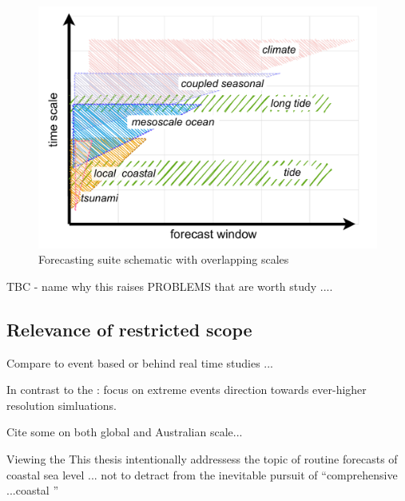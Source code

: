 \begin{figure}[H]\centering
  \includegraphics[width=\figwidthBig]{figures/diagrams/scales.pdf}
  \caption{Forecasting suite schematic with overlapping scales}
  \label{fig:SCALES}
\end{figure}



TBC - name why this raises PROBLEMS that are worth study ....

\subsection{Relevance of restricted scope}

Compare to event based or behind real time studies ...


In contrast to the :
focus on extreme events
direction towards ever-higher resolution simluations.


Cite some on both global and Australian scale...


Viewing the
This thesis intentionally addressess the topic of routine forecasts of coastal sea level 
...
not to detract from the inevitable pursuit of ``comprehensive ...coastal '' 



